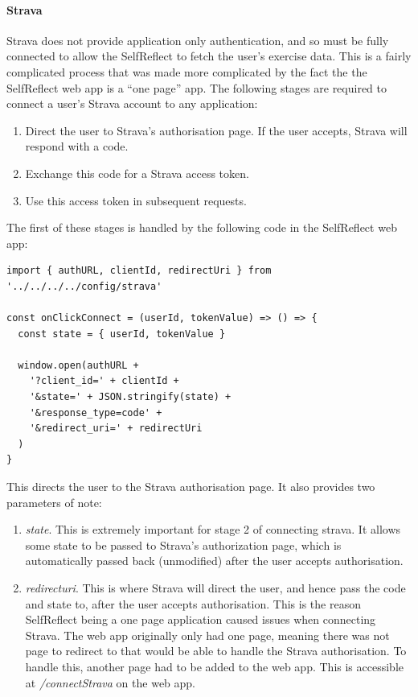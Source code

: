 \documentclass[11pt,openright,a4paper]{report}
\begin{document}
\paragraph{Strava} Strava does not provide application only authentication, and so must be fully connected to allow the SelfReflect to fetch the user's exercise data. This is a fairly complicated process that was made more complicated by the fact the the SelfReflect web app is a \enquote{one page} app. The following stages are required to connect a user's Strava account to any application:
\begin{enumerate}
\item Direct the user to Strava's authorisation page. If the user accepts, Strava will respond with a code.
\item Exchange this code for a Strava access token.
\item Use this access token in subsequent requests.
\end{enumerate}

The first of these stages is handled by the following code in the SelfReflect web app:
\begin{lstlisting}
import { authURL, clientId, redirectUri } from '../../../../config/strava'

const onClickConnect = (userId, tokenValue) => () => {
  const state = { userId, tokenValue }

  window.open(authURL +
    '?client_id=' + clientId +
    '&state=' + JSON.stringify(state) +
    '&response_type=code' +
    '&redirect_uri=' + redirectUri
  )
}
\end{lstlisting}

This directs the user to the Strava authorisation page. It also provides two parameters of note:
\begin{enumerate}
\item \emph{state}. This is extremely important for stage 2 of connecting strava. It allows some state to be passed to Strava's authorization page, which is automatically passed back (unmodified) after the user accepts authorisation.
\item \emph{redirect\textunderscore uri}. This is where Strava will direct the user, and hence pass the code and state to, after the user accepts authorisation. This is the reason SelfReflect being a one page application caused issues when connecting Strava. The web app originally only had one page, meaning there was not page to redirect to that would be able to handle the Strava authorisation. To handle this, another page had to be added to the web app. This is accessible at \emph{/connectStrava} on the web app.
\end{enumerate}
\end{document}
